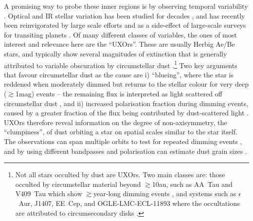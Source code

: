 \documentclass[useAMS,usenatbib,usegraphicx]{mn2e}
\begin{document}
A promising way to probe these inner regions is by observing temporal variability
\citep[e.g.][]{2014Sci...345.1032M}. Optical and IR stellar variation has been studied
for decades \citep[e.g.][]{1945ApJ...102..168J,1994AJ....108.1906H}, and has recently
been reinvigorated by large scale efforts
\citep[e.g.][]{2011ApJ...733...50M,2014AJ....147...82C} and as a side-effect of
large-scale surveys for transiting planets
\citep{2012AJ....143...72M,2013AJ....146..112R,2016MNRAS.457.3988B}. Of many different
classes of variables, the ones of most interest and relevance here are the
``UXOrs''. These are usually Herbig Ae/Be stars, and typically show several magnitudes of
extinction that is generally attributed to variable obscuration by circumstellar dust
\citep{1994AJ....108.1906H,1999AJ....118.1043H,2000A&A...364..633N}.\footnote{Not all
  stars occulted by dust are UXOrs. Two main classes are: those occulted by circumstellar
  material beyond $\gtrsim$10au, such as AA~Tau and V409~Tau which show
  $\gtrsim$year-long dimming events \citep{2013A&A...557A..77B,2015AJ....150...32R}, and
  systems such as $\epsilon$~Aur, J1407, EE~Cep, and OGLE-LMC-ECL-11893 where the
  occultations are attributed to circumsecondary disks
  \citep[e.g.][]{1999MNRAS.303..521M,2012AJ....143...72M,2014ApJ...788...41D,2015ApJS..220...14K}.}
Two key arguments that favour circumstellar dust as the cause are i) ``blueing'', where
the star is reddened when moderately dimmed but returns to the stellar colour for very
deep ($\gtrsim$1mag) events -- the remaining flux is interpreted as light scattered off
circumstellar dust \citep{1988SvAL...14...27G}, and ii) increased polarisation fraction
during dimming events, caused by a greater fraction of the flux being contributed by
dust-scattered light \citep[e.g.][]{2001ARep...45...51R}. UXOrs therefore reveal
information on the degree of non-axisymmetry, the ``clumpiness'', of dust orbiting a star
on spatial scales similar to the star itself. The observations can span multiple orbits
to test for repeated dimming events \citep[e.g.][]{1999A&A...349..619B}, and by using
different bandpasses and polarisation can estimate dust grain sizes
\citep[e.g.][]{1988SvAL...14...27G,1994ASPC...62...63G}.
\end{document}

